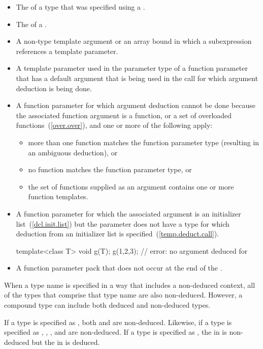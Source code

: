 %
\begin{itemize}
\item
The
of a type that was specified using a
.
\item
The  of a .
\item
A non-type template argument or an array bound in which a subexpression
references a template parameter.
\item
A template parameter used in the parameter type of a function parameter that
has a default argument that is being used in the call for which argument
deduction is being done.
\item
A function parameter for which argument deduction cannot be done because the
associated function argument is a function, or a set of overloaded
functions~(\ref{over.over}), and one or more of the following apply:
\begin{itemize}
\item
more than one function matches the function parameter type (resulting in
an ambiguous deduction), or
\item
no function matches the function parameter type, or
\item
the set of functions supplied as an argument contains one or more function templates.
\end{itemize}
\item A function parameter for which the associated argument is an initializer
list~(\ref{dcl.init.list}) but the parameter does not have
a type for which deduction from an initializer list is specified~(\ref{temp.deduct.call}).
\begin{example}
\begin{codeblock}
template<class T> void g(T);
g({1,2,3});                 // error: no argument deduced for 
\end{codeblock}
\end{example}
\item A function parameter pack that does not occur at the end of the
.
\end{itemize}

\pnum
When a type name is specified in a way that includes a non-deduced
context, all of the types that comprise that type name are also
non-deduced.
However, a compound type can include both deduced and non-deduced types.
\begin{example}
If a type is specified as
,
both
and
are non-deduced.
Likewise, if a type is specified as
,
,
,
and
are non-deduced.
If a type is specified as
,
the
in
is non-deduced but
the
in
is deduced.
\end{example}

